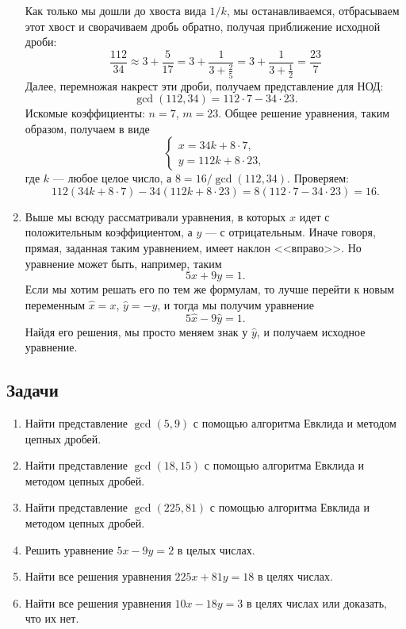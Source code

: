 \begin{enumerate}
Как только мы дошли до хвоста вида $1/k$, мы останавливаемся, отбрасываем этот хвост и сворачиваем дробь обратно, получая приближение исходной дроби:
$$
\frac{112}{34} \approx 3 + \frac{5}{17} = 3 + \frac{1}{3+\frac{2}{5}} = 
3 + \frac{1}{3 + \frac{1}{2}} = \frac{23}{7}
$$
Далее, перемножая накрест эти дроби, получаем представление для НОД:
$$
\gcd(112,34) = 112\cdot 7 - 34\cdot 23.
$$
Искомые коэффициенты: $n=7$, $m=23$. Общее решение уравнения, таким образом, получаем в виде
$$
\begin{cases}
x  = 34k +  8\cdot 7, \\
y  = 112k + 8\cdot 23 ,
\end{cases}
$$
где $k$ --- любое целое число, а $8=16/\gcd(112,34)$. Проверяем:
$$
112(34k +  8\cdot 7)-34(112k + 8\cdot 23) = 8(112\cdot 7- 34\cdot 23) = 16.
$$
\item Выше мы всюду рассматривали уравнения, в которых $x$ идет с положительным коэффициентом, а $y$ --- с отрицательным. Иначе говоря, прямая, заданная таким уравнением, имеет наклон <<вправо>>. Но уравнение может быть, например, таким
$$
5x+9y=1.
$$
Если мы хотим решать его по тем же формулам, то лучше перейти к новым переменным $\hat x=x$, $\hat y=-y$, и тогда мы получим уравнение
$$
5\hat x-9\hat y=1.
$$
Найдя его решения, мы просто меняем знак у $\hat y$, и получаем исходное уравнение.
\end{enumerate}

\subsection*{Задачи}

\begin{enumerate}
\item Найти представление $\gcd(5,9)$ с помощью алгоритма Евклида и методом цепных дробей.
\item Найти представление $\gcd(18,15)$ с помощью алгоритма Евклида и методом цепных дробей.
\item Найти представление $\gcd(225,81)$ с помощью алгоритма Евклида и методом цепных дробей.
\item Решить уравнение $5x-9y=2$ в целых числах.
\item Найти все решения уравнения $225x+81y=18$ в целях числах.
\item Найти все решения уравнения $10x-18y=3$ в целях числах или доказать, что их нет.
\end{enumerate}



